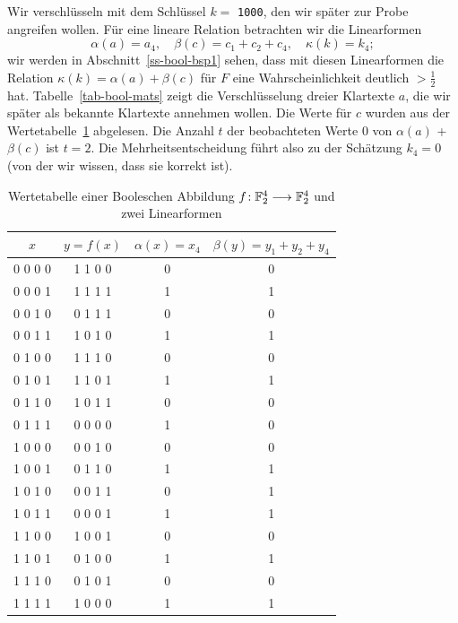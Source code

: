 \begin{refsegment}
Wir verschlüsseln mit dem Schlüssel $k =$ \verb:1000:, den wir später zur
Probe angreifen wollen. Für eine lineare Relation betrachten wir die
Linearformen
\[
     \alpha(a) = a_4, \quad \beta(c) = c_1 + c_2 + c_4, \quad \kappa(k) = k_4;
\]
wir werden in Abschnitt~\ref{ss-bool-bsp1} sehen, dass mit diesen
Linearformen die Relation
$\kappa(k) = \alpha(a) + \beta(c)$ für $F$ eine Wahrscheinlichkeit
deutlich $> \frac{1}{2}$ hat. Tabelle~\ref{tab-bool-mats} zeigt die
Verschlüsselung dreier Klartexte $a$, die wir später als bekannte
Klartexte annehmen wollen. Die Werte für $c$ wurden aus der
Wertetabelle~\ref{tab-bool-A1} abgelesen. Die Anzahl $t$ der
beobachteten Werte $0$ von $\alpha(a)$ + $\beta(c)$ ist $t = 2$.
Die Mehrheitsentscheidung führt also zu der Schätzung $k_4 = 0$
(von der wir wissen, dass sie korrekt ist).

\begin{table}
\begin{center}
\begin{tabular}{|c|c|c|c|} \hline
       $x$   & $y=f(x)$& $\alpha(x) = x_4$ & $\beta(y) = y_1+y_2+y_4$ \\ \hline
     0 0 0 0 & 1 1 0 0 &   0   &  0  \\
     0 0 0 1 & 1 1 1 1 &   1   &  1  \\
     0 0 1 0 & 0 1 1 1 &   0   &  0  \\
     0 0 1 1 & 1 0 1 0 &   1   &  1  \\
     0 1 0 0 & 1 1 1 0 &   0   &  0  \\
     0 1 0 1 & 1 1 0 1 &   1   &  1  \\
     0 1 1 0 & 1 0 1 1 &   0   &  0  \\
     0 1 1 1 & 0 0 0 0 &   1   &  0  \\
     1 0 0 0 & 0 0 1 0 &   0   &  0  \\
     1 0 0 1 & 0 1 1 0 &   1   &  1  \\
     1 0 1 0 & 0 0 1 1 &   0   &  1  \\
     1 0 1 1 & 0 0 0 1 &   1   &  1  \\
     1 1 0 0 & 1 0 0 1 &   0   &  0  \\
     1 1 0 1 & 0 1 0 0 &   1   &  1  \\
     1 1 1 0 & 0 1 0 1 &   0   &  0  \\
     1 1 1 1 & 1 0 0 0 &   1   &  1  \\ \hline
\end{tabular}
\end{center}
\caption{Wertetabelle einer Booleschen Abbildung
  $f\!: \mathbb{F}_2^4 \longrightarrow \mathbb{F}_2^4$ und zwei Linearformen}\label{tab-bool-A1}
\end{table}


\end{refsegment}
